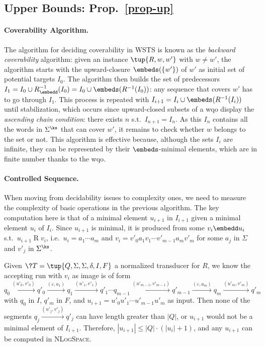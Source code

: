 \subsection{Upper Bounds: Prop.~\ref{prop-up}}\label{ax-upb}
\paragraph{Coverability Algorithm.}  
The algorithm for deciding coverability in WSTS is known as
the \emph{backward coverability} algorithm: given an instance
$\tup{R,w,w'}$ with $w\neq w'$, the algorithm starts with the
upward-closure $\embeds(\{w'\})$ of $w'$ as initial set of potential
targets $I_0$.  The algorithm then builds the set of predecessors
$I_1=I_0\cup R_\embedd^{-1}(I_0)=I_0\cup\embeds(R^{-1}(I_0))$: any
sequence that covers $w'$ has to go through $I_1$.  This process is
repeated with $I_{i+1}=I_i\cup\embeds(R^{-1}(I_{i}))$ until
stabilization, which occurs since upward-closed subsets of a wqo
display the
\emph{ascending chain condition}: there exists $n$
s.t.\ $I_{n+1}=I_n$.  As this $I_n$ contains all the words in
$\Sigma^\ks$ that can cover $w'$, it remains to check whether $w$
belongs to the set or not.
This algorithm is effective because, although the sets $I_i$ are
infinite, they can be represented by their $\embeds$-minimal elements,
which are in finite number thanks to the wqo.

\paragraph{Controlled Sequence.}
When moving from decidability issues to complexity ones, we need to
measure the complexity of basic operations in the previous algorithm.
The key computation here is that of a minimal element $u_{i+1}$ in $I_{i+1}$
given a minimal element $u_i$ of $I_i$.  Since $u_{i+1}$ is minimal,
it is produced from some $v_i\embedd u_i$ s.t.\
$u_{i+1}\mathbin{R}v_i$, i.e.\ $u_i=a_1\cdots a_m$ and
$v_i=v'_0a_1v_1\cdots v'_{m-1}a_mv'_m$ for some $a_j$ in $\Sigma$ and
$v'_j$ in $\Sigma^\ks$.

Given $\?T=\tup{Q,\Sigma,\Sigma,\delta,I,F}$ a normalized transducer
for $R$, we know the accepting run with $v_i$ as image is of form
\begin{equation}
  q_0\xrightarrow{(u'_0,v'_0)}q'_0\xrightarrow{(\varepsilon,a_1)}q_1\xrightarrow{(u'_1,v'_1)}q'_1\cdots
  q_{m-1}\xrightarrow{(u'_{m-1},v'_{m-1})}q'_{m-1}\xrightarrow{(\varepsilon,a_m)}q_m\xrightarrow{(u'_m,v'_m)}q'_m
\end{equation}
with $q_0$ in $I$, $q'_m$ in $F$, and $u_{i+1}=u'_0u'_1\cdots
u'_{m-1}u'_m$ as input.  Then none of the segments
$q_j\xrightarrow{(u'_j,v'_j)}q'_j$ can have length greater than $|Q|$,
or $u_{i+1}$ would not be a minimal element of $I_{i+1}$.  Therefore,
$|u_{i+1}|\leq |Q|\cdot(|u_i|+1)$, and any $u_{i+1}$ can be computed
in \textsc{NLogSpace}.

